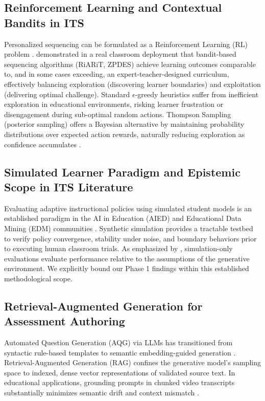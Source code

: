 \documentclass[notitlepage,12pt]{jedm}
\begin{document}
\subsection{Reinforcement Learning and Contextual Bandits in ITS}
Personalized sequencing can be formulated as a Reinforcement Learning (RL) problem \cite{doroudi2019where}. \cite{clement2015multi} demonstrated in a real classroom deployment that bandit-based sequencing algorithms (RiARiT, ZPDES) achieve learning outcomes comparable to, and in some cases exceeding, an expert-teacher-designed curriculum, effectively balancing exploration (discovering learner boundaries) and exploitation (delivering optimal challenge). Standard $\epsilon$-greedy heuristics suffer from inefficient exploration in educational environments, risking learner frustration or disengagement during sub-optimal random actions. Thompson Sampling (posterior sampling) offers a Bayesian alternative by maintaining probability distributions over expected action rewards, naturally reducing exploration as confidence accumulates \cite{agrawal2012analysis,chapelle2011empirical,clement2015multi}.

\subsection{Simulated Learner Paradigm and Epistemic Scope in ITS Literature}
Evaluating adaptive instructional policies using simulated student models is an established paradigm in the AI in Education (AIED) and Educational Data Mining (EDM) communities \cite{vanlehn2006behavior,rafferty2016faster,doroudi2019where}. Synthetic simulation provides a tractable testbed to verify policy convergence, stability under noise, and boundary behaviors prior to executing human classroom trials. As emphasized by \cite{doroudi2019where}, simulation-only evaluations evaluate performance relative to the assumptions of the generative environment. We explicitly bound our Phase 1 findings within this established methodological scope.

\subsection{Retrieval-Augmented Generation for Assessment Authoring}
Automated Question Generation (AQG) via LLMs has transitioned from syntactic rule-based templates to semantic embedding-guided generation \cite{lewis2020retrieval,scarlatos2024distractor}. Retrieval-Augmented Generation (RAG) confines the generative model's sampling space to indexed, dense vector representations of validated source text. In educational applications, grounding prompts in chunked video transcripts substantially minimizes semantic drift and context mismatch \cite{gao2023retrieval,niu2024reducing}.
\end{document}
